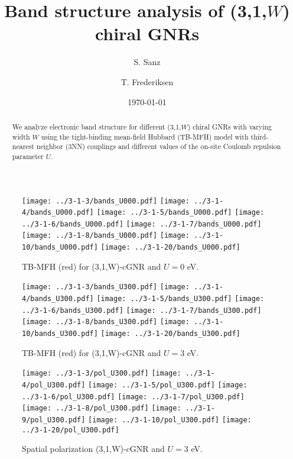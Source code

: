 \documentclass[twocolumn,amsmath,%
amssymb,prb,superscriptaddress]{revtex4}
\begin{document}
\title{Band structure analysis of (3,1,$W$) chiral GNRs}

\author{S. Sanz}

\author{T. Frederiksen}

\date{\today}

\begin{abstract}
We analyze electronic band structure for different (3,1,$W$) chiral GNRs with varying width 
$W$ using the tight-binding mean-field Hubbard (TB-MFH) model 
with third-nearest neighbor (3NN) couplings and
different values of the on-site Coulomb repulsion parameter $U$.
\end{abstract}

\maketitle

\begin{figure*}
	\texttt{[image: ../3-1-3/bands\_U000.pdf]}	\texttt{[image: ../3-1-4/bands\_U000.pdf]}
	\texttt{[image: ../3-1-5/bands\_U000.pdf]}
	\texttt{[image: ../3-1-6/bands\_U000.pdf]}
	\texttt{[image: ../3-1-7/bands\_U000.pdf]}
	\texttt{[image: ../3-1-8/bands\_U000.pdf]}
	\texttt{[image: ../3-1-10/bands\_U000.pdf]}
	\texttt{[image: ../3-1-20/bands\_U000.pdf]}
	\caption{TB-MFH (red) for (3,1,W)-cGNR and $U=0$ eV.} 
\end{figure*}

\begin{figure*}
	\texttt{[image: ../3-1-3/bands\_U300.pdf]}	\texttt{[image: ../3-1-4/bands\_U300.pdf]}
	\texttt{[image: ../3-1-5/bands\_U300.pdf]}
	\texttt{[image: ../3-1-6/bands\_U300.pdf]}
	\texttt{[image: ../3-1-7/bands\_U300.pdf]}
	\texttt{[image: ../3-1-8/bands\_U300.pdf]}
	\texttt{[image: ../3-1-10/bands\_U300.pdf]}
	\texttt{[image: ../3-1-20/bands\_U300.pdf]}
	\caption{TB-MFH (red) for (3,1,W)-cGNR and $U=3$ eV.} 
\end{figure*}

\begin{figure*}
	\texttt{[image: ../3-1-3/pol\_U300.pdf]}
	\texttt{[image: ../3-1-4/pol\_U300.pdf]}
	\texttt{[image: ../3-1-5/pol\_U300.pdf]}
	\texttt{[image: ../3-1-6/pol\_U300.pdf]}
	\texttt{[image: ../3-1-7/pol\_U300.pdf]}
	\texttt{[image: ../3-1-8/pol\_U300.pdf]}
	\texttt{[image: ../3-1-9/pol\_U300.pdf]}
	\texttt{[image: ../3-1-10/pol\_U300.pdf]}
	\texttt{[image: ../3-1-20/pol\_U300.pdf]}
	\caption{Spatial polarization (3,1,W)-cGNR and $U=3$ eV.} 
\end{figure*}
	

\end{document}
